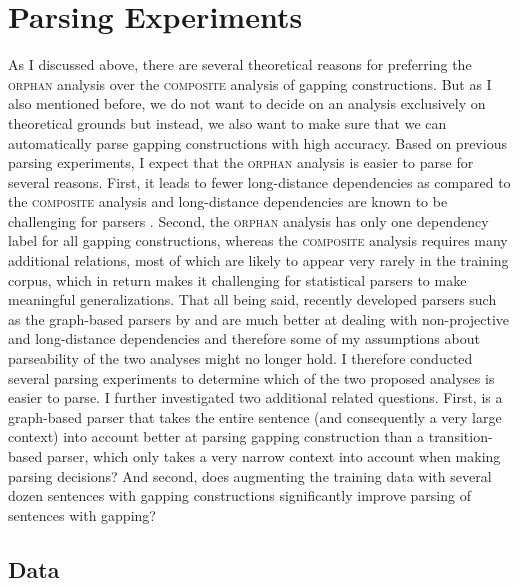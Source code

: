 \documentclass[lucida,biblatex]{sp} %
\begin{document}
\section{Parsing Experiments}
\label{sec:parsing}

As I discussed above, there are several theoretical reasons for preferring the \textsc{orphan} analysis over the \textsc{composite} analysis of gapping constructions. But as I also mentioned before, we do not want to decide on an analysis exclusively on theoretical grounds but instead, we also want to make sure that we can automatically parse gapping constructions with high accuracy. Based on previous parsing experiments, I expect that the \textsc{orphan} analysis is easier to parse for several reasons. First, it leads to fewer long-distance dependencies as compared to the \textsc{composite} analysis and long-distance dependencies are known to be challenging for parsers \citep{McDonald2007}. Second, the \textsc{orphan} analysis has only one dependency label for all gapping constructions, whereas the \textsc{composite} analysis requires many additional relations, most of which are likely to appear very rarely in the training corpus, which in return makes it challenging for statistical parsers to make meaningful generalizations. That all being said, recently developed parsers such as the graph-based parsers by \textcite{Kiperwasser2016} and \textcite{Dozat2017} are much better at dealing with non-projective and long-distance dependencies \citep{Dozat2017b} and therefore some of my assumptions about parseability of the two analyses might no longer hold. I therefore conducted several parsing experiments to determine which of the two proposed analyses is easier to parse. I further investigated two additional related questions. First, is a graph-based parser that takes the entire sentence (and consequently a very large context) into account better at parsing gapping construction than a transition-based parser, which only takes a very narrow context into account when making parsing decisions? And second, does augmenting the training data with several dozen sentences with gapping constructions significantly improve parsing of sentences with gapping?


\subsection{Data}
\end{document}
